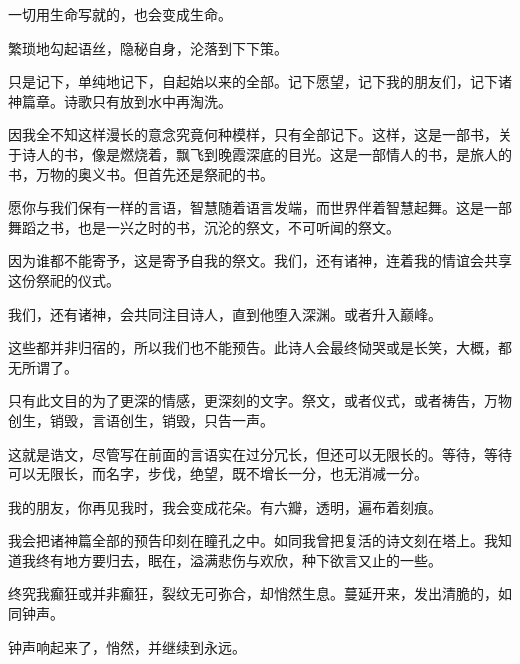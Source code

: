 \documentclass[UTF8]{article}
\begin{document}
\par 一切用生命写就的，也会变成生命。
\\[0.6cm]
\par 繁琐地勾起语丝，隐秘自身，沦落到下下策。
\par 只是记下，单纯地记下，自起始以来的全部。记下愿望，记下我的朋友们，记下诸神篇章。诗歌只有放到水中再淘洗。
\par 因我全不知这样漫长的意念究竟何种模样，只有全部记下。这样，这是一部书，关于诗人的书，像是燃烧着，飘飞到晚霞深底的目光。这是一部情人的书，是旅人的书，万物的奥义书。但首先还是祭祀的书。
\par 愿你与我们保有一样的言语，智慧随着语言发端，而世界伴着智慧起舞。这是一部舞蹈之书，也是一兴之时的书，沉沦的祭文，不可听闻的祭文。
\par 因为谁都不能寄予，这是寄予自我的祭文。我们，还有诸神，连着我的情谊会共享这份祭祀的仪式。
\par 我们，还有诸神，会共同注目诗人，直到他堕入深渊。或者升入巅峰。
\par 这些都并非归宿的，所以我们也不能预告。此诗人会最终恸哭或是长笑，大概，都无所谓了。
\par 只有此文目的为了更深的情感，更深刻的文字。祭文，或者仪式，或者祷告，万物创生，销毁，言语创生，销毁，只告一声。
\\[0.6cm]
\par 这就是诰文，尽管写在前面的言语实在过分冗长，但还可以无限长的。等待，等待可以无限长，而名字，步伐，绝望，既不增长一分，也无消减一分。
\par 我的朋友，你再见我时，我会变成花朵。有六瓣，透明，遍布着刻痕。
\par 我会把诸神篇全部的预告印刻在瞳孔之中。如同我曾把复活的诗文刻在塔上。我知道我终有地方要归去，眠在，溢满悲伤与欢欣，种下欲言又止的一些。
\par 终究我癫狂或并非癫狂，裂纹无可弥合，却悄然生息。蔓延开来，发出清脆的，如同钟声。
\par 钟声响起来了，悄然，并继续到永远。
\end{document}
